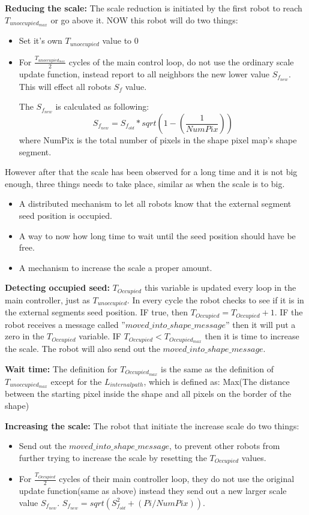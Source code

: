 \begin{itemize}
\textbf{Reducing the scale:}
The scale reduction is initiated by the first robot to reach $T_{unoccupied_{max}}$ or go above it. NOW this robot will do two things:
\begin{itemize}
\item Set it’s own $T_{unoccupied}$ value to 0
\item For $\frac{T_{unoccupied_{max}}}{2}$ cycles of the main control loop, do not use the ordinary scale update function, instead report to all neighbors the new lower value $S_{f_{new}}$. This will effect all robots $S_f$ value.

The $S_{f_{new}}$ is calculated as following:
\begin{equation}
S_{f_{new}} = S_{f_{old}} * sqrt(1-(\frac{1}{NumPix}))
\end{equation}
where NumPix is the total number of pixels in the shape pixel map’s shape segment.
\end{itemize}

However after that the scale has been observed for a long time and it is not big enough, three things needs to take place, similar as when the scale is to big.
\begin{itemize}
\item A distributed mechanism to let all robots know that the external segment seed position is occupied.
\item A way to now how long time to wait until the seed position should have be free.
\item A mechanism to increase the scale a proper amount.
\end{itemize}

\textbf{Detecting occupied seed:}
$T_{Occupied}$ this variable is updated every loop in the main controller, just as $T_{unoccupied}$. In every cycle the robot checks to see if it is in the external segments seed position. IF true, then $T_{Occupied} = T_{Occupied} +1$.
IF the robot receives a message called ”$moved\_into\_shape\_message$” then it will put a zero in the $T_{Occupied}$ variable. IF $T_{Occupied}  < T_{Occupied_{max}}$ then it is time to increase the scale.
The robot will also send out the $moved\_into\_shape\_message$.
	
\textbf{Wait time:}
The definition for $T_{Occupied_{max}}$ is the same as the definition of $T_{unoccupied_{max}}$ except for the $L_{internalpath}$,
which is defined as: Max(The distance between the starting pixel inside the shape and all pixels on the border of the shape)

\textbf{Increasing the scale:}
The robot that initiate the increase scale do two things:
\begin{itemize}
\item Send out the $moved\_into\_shape\_message$, to prevent other robots from further trying to increase the scale by resetting the $T_{Occupied}$ values.
\item For $\frac{T_{Occupied}}{2}$ cycles of their main controller loop, they do not use the original update function(same as above) instead they send out a new larger scale value  $S_{f_{new}}$.
$S_{f_{new}} = sqrt(S_{f_{old}}^2 + (Pi/NumPix))$.
\end{itemize}


\end{itemize}
